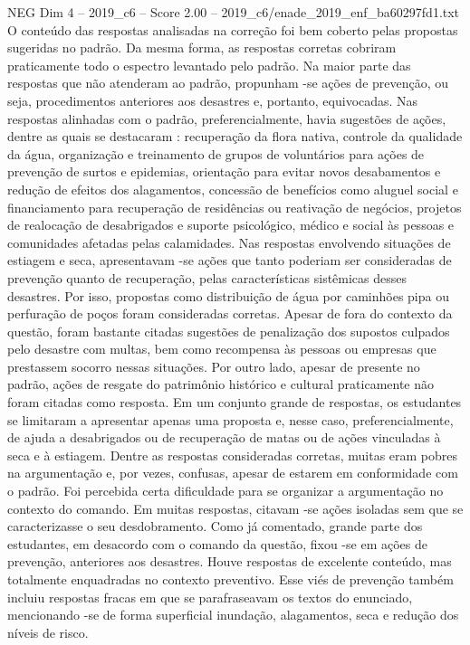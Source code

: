 \begin{textsample}{NEG Dim 4 – 2019\_c6 – Score 2.00 – 2019\_c6/enade\_2019\_enf\_ba60297fd1.txt}
O conteúdo das respostas analisadas na correção foi bem coberto pelas propostas sugeridas no padrão.
Da mesma forma, as respostas corretas cobriram praticamente todo o espectro levantado pelo padrão.
Na maior parte das respostas que não atenderam ao padrão, propunham -se ações de prevenção, ou seja, procedimentos anteriores aos desastres e, portanto, equivocadas.
Nas respostas alinhadas com o padrão, preferencialmente, havia sugestões de ações, dentre as quais se destacaram : recuperação da flora nativa, controle da qualidade da água, organização e treinamento de grupos de voluntários para ações de prevenção de surtos e epidemias, orientação para evitar novos desabamentos e redução de efeitos dos alagamentos, concessão de benefícios como aluguel social e financiamento para recuperação de residências ou reativação de negócios, projetos de realocação de desabrigados e suporte psicológico, médico e social às pessoas e comunidades afetadas pelas calamidades.
Nas respostas envolvendo situações de estiagem e seca, apresentavam -se ações que tanto poderiam ser consideradas de prevenção quanto de recuperação, pelas características sistêmicas desses desastres.
Por isso, propostas como distribuição de água por caminhões pipa ou perfuração de poços foram consideradas corretas.
Apesar de fora do contexto da questão, foram bastante citadas sugestões de penalização dos supostos culpados pelo desastre com multas, bem como recompensa às pessoas ou empresas que prestassem socorro nessas situações.
Por outro lado, apesar de presente no padrão, ações de resgate do patrimônio histórico e cultural praticamente não foram citadas como resposta.
Em um conjunto grande de respostas, os estudantes se limitaram a apresentar apenas uma proposta e, nesse caso, preferencialmente, de ajuda a desabrigados ou de recuperação de matas ou de ações vinculadas à seca e à estiagem.
Dentre as respostas consideradas corretas, muitas eram pobres na argumentação e, por vezes, confusas, apesar de estarem em conformidade com o padrão.
Foi percebida certa dificuldade para se organizar a argumentação no contexto do comando.
Em muitas respostas, citavam -se ações isoladas sem que se caracterizasse o seu desdobramento.
Como já comentado, grande parte dos estudantes, em desacordo com o comando da questão, fixou -se em ações de prevenção, anteriores aos desastres.
Houve respostas de excelente conteúdo, mas totalmente enquadradas no contexto preventivo.
Esse viés de prevenção também incluiu respostas fracas em que se parafraseavam os textos do enunciado, mencionando -se de forma superficial inundação, alagamentos, seca e redução dos níveis de risco.

\end{textsample}
